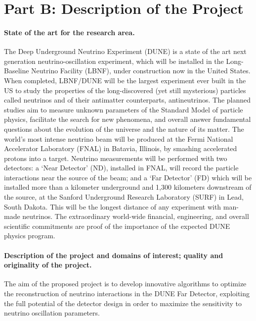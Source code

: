 \section{Part B: Description of the Project}
\vspace{-0.3cm}
\paragraph{State of the art for the research area.} The Deep Underground Neutrino Experiment (DUNE) is a state of the art next generation neutrino-oscillation experiment, which will be installed in the Long-Baseline Neutrino Facility (LBNF), under construction now in the United States. When completed, LBNF/DUNE will be the largest experiment ever built in the US to study the properties of the long-discovered (yet still mysterious) particles called neutrinos and of their antimatter counterparts, antineutrinos. The planned studies aim to measure unknown parameters of the Standard Model of particle physics, facilitate the search for new phenomena, and overall answer fundamental questions about the evolution of the universe and the nature of its matter. The world’s most intense neutrino beam will be produced at the Fermi National Accelerator Laboratory (FNAL) in Batavia, Illinois, by smashing accelerated protons into a target. Neutrino measurements will be performed with two detectors: a `Near Detector’ (ND), installed in FNAL, will record the particle interactions near the source of the beam; and a `Far Detector’ (FD) which will be installed more than a kilometer underground and 1,300 kilometers downstream of the source, at the Sanford Underground Research Laboratory (SURF) in Lead, South Dakota. This will be the longest distance of any experiment with man-made neutrinos. The extraordinary world-wide financial, engineering, and overall scientific commitments are proof of the importance of the expected DUNE physics program. 
\vspace{-0.5cm}
\paragraph{Description of the project and domains of interest; quality and originality of the project.} The aim of the proposed project is to develop innovative algorithms to optimize the reconstruction of neutrino interactions in the DUNE Far Detector, exploiting the full potential of the detector design in order to maximize the sensitivity to neutrino oscillation parameters. 

